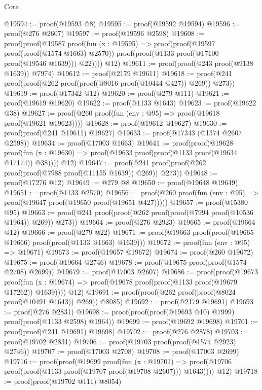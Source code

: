 \begin{lexlean}{Core}
\begin{coremodule}
@19594 := proof(@19593 @8)
@19595 := proof(@19592 @19594)
@19596 := proof(@276 @2607)
@19597 := proof(@19596 @2598)
@19608 := proof(proof(@19587
        proof(fun (x : @19595) =>
          proof(proof(@19597 proof(proof(@1574 @1663) @2570))
              proof(proof(@1133 proof(@17100 proof(@19546 @1639))) @22))))
      @12)
@19611 := proof(proof(@243 proof(@9138 @1639)) @7974)
@19612 := proof(@2179 @19611)
@19618 := proof(@241 proof(proof(@262 proof(proof(@8016 proof(@10444 @427)) @269)) @273))
@19619 := proof(@17342 @12)
@19620 := proof(@279 @111)
@19621 := proof(@19619 @19620)
@19622 := proof(@1133 @1643)
@19623 := proof(@19622 @38)
@19627 := proof(@260 proof(fun (env : @95) => proof(@19618 proof(@19621 @19623))))
@19628 := proof(@19612 @19627)
@19630 := proof(proof(@241 @19611) @19627)
@19633 := proof(@17343 (@1574 @2607 @2598))
@19634 := proof(@17003 @1663)
@19641 := proof(proof(@19628
        proof(fun (x : @19630) => proof(@19633 proof(proof(@1133 proof(@19634 @17174)) @38))))
      @12)
@19647 := proof(@241 proof(proof(@262 proof(proof(@7988 proof(@11155 @1639)) @269)) @273))
@19648 := proof(@17276 @12)
@19649 := @279 @8
@19650 := proof(@19648 @19649)
@19651 := proof(@1133 @2570)
@19656 := proof(@260 proof(fun (env : @95) => proof(@19647 proof(@19650 proof(@19651 @427)))))
@19657 := proof(@15380 @95)
@19663 := proof(@241 proof(proof(@262 proof(proof(@7994 proof(@10536 @1964)) @269)) @273))
@19664 := proof(@276 @2923)
@19665 := proof(@19664 @12)
@19666 := proof(@279 @22)
@19671 := proof(@19663 proof(proof(@19665 @19666) proof(proof(@1133 @1663) @1639)))
@19672 := proof(fun (env : @95) => @19671)
@19673 := proof(@19657 @19672)
@19674 := proof(@260 @19672)
@19675 := proof(@19664 @2746)
@19678 := proof(@19675 proof(proof(@1574 @2708) @2699))
@19679 := proof(@17003 @2607)
@19686 := proof(proof(@19673
        proof(fun (x : @19674) => proof(@19678 proof(proof(@1133 proof(@19679 @17262)) @1639))))
      @12)
@19691 := proof(proof(@262 proof(proof(@8024 proof(@10491 @1643)) @269)) @8085)
@19692 := proof(@2179 @19691)
@19693 := proof(@276 @2831)
@19698 := proof(proof(proof(@19693 @10) @7999) proof(proof(@1133 @2598) @1964))
@19699 := proof(@19692 @19698)
@19701 := proof(proof(@241 @19691) @19698)
@19702 := proof(@276 @2878)
@19703 := proof(@19702 @2831)
@19706 := proof(@19703 proof(proof(@1574 @2923) @2746))
@19707 := proof(@17003 @2708)
@19708 := proof(@17003 @2699)
@19716 := proof(proof(@19699
        proof(fun (x : @19701) =>
          proof(@19706 proof(proof(@1133 proof(@19707 proof(@19708 @2607))) @1643))))
      @12)
@19718 := proof(proof(@19702 @111) @8054)

\end{coremodule}
\end{lexlean}
